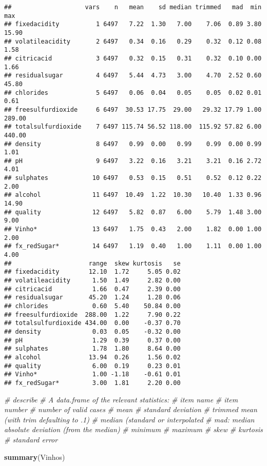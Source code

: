 \documentclass[]{article}
\newenvironment{Shaded}{\begin{snugshade}}{\end{snugshade}}
\newcommand{\KeywordTok}[1]{\textcolor[rgb]{0.13,0.29,0.53}{\textbf{#1}}}
\newcommand{\CommentTok}[1]{\textcolor[rgb]{0.56,0.35,0.01}{\textit{#1}}}
\newcommand{\NormalTok}[1]{#1}
\begin{document}
\begin{verbatim}
##                    vars    n   mean    sd median trimmed   mad  min    max
## fixedacidity          1 6497   7.22  1.30   7.00    7.06  0.89 3.80  15.90
## volatileacidity       2 6497   0.34  0.16   0.29    0.32  0.12 0.08   1.58
## citricacid            3 6497   0.32  0.15   0.31    0.32  0.10 0.00   1.66
## residualsugar         4 6497   5.44  4.73   3.00    4.70  2.52 0.60  45.80
## chlorides             5 6497   0.06  0.04   0.05    0.05  0.02 0.01   0.61
## freesulfurdioxide     6 6497  30.53 17.75  29.00   29.32 17.79 1.00 289.00
## totalsulfurdioxide    7 6497 115.74 56.52 118.00  115.92 57.82 6.00 440.00
## density               8 6497   0.99  0.00   0.99    0.99  0.00 0.99   1.01
## pH                    9 6497   3.22  0.16   3.21    3.21  0.16 2.72   4.01
## sulphates            10 6497   0.53  0.15   0.51    0.52  0.12 0.22   2.00
## alcohol              11 6497  10.49  1.22  10.30   10.40  1.33 0.96  14.90
## quality              12 6497   5.82  0.87   6.00    5.79  1.48 3.00   9.00
## Vinho*               13 6497   1.75  0.43   2.00    1.82  0.00 1.00   2.00
## fx_redSugar*         14 6497   1.19  0.40   1.00    1.11  0.00 1.00   4.00
##                     range  skew kurtosis   se
## fixedacidity        12.10  1.72     5.05 0.02
## volatileacidity      1.50  1.49     2.82 0.00
## citricacid           1.66  0.47     2.39 0.00
## residualsugar       45.20  1.24     1.28 0.06
## chlorides            0.60  5.40    50.84 0.00
## freesulfurdioxide  288.00  1.22     7.90 0.22
## totalsulfurdioxide 434.00  0.00    -0.37 0.70
## density              0.03  0.05    -0.32 0.00
## pH                   1.29  0.39     0.37 0.00
## sulphates            1.78  1.80     8.64 0.00
## alcohol             13.94  0.26     1.56 0.02
## quality              6.00  0.19     0.23 0.01
## Vinho*               1.00 -1.18    -0.61 0.01
## fx_redSugar*         3.00  1.81     2.20 0.00
\end{verbatim}

\begin{Shaded}
\begin{Highlighting}[]
\CommentTok{# describe}
\CommentTok{# A data.frame of the relevant statistics:}
\CommentTok{# item name}
\CommentTok{# item number}
\CommentTok{# number of valid cases}
\CommentTok{# mean}
\CommentTok{# standard deviation}
\CommentTok{# trimmed mean (with trim defaulting to .1)}
\CommentTok{# median (standard or interpolated}
\CommentTok{# mad: median absolute deviation (from the median)}
\CommentTok{# minimum}
\CommentTok{# maximum}
\CommentTok{# skew}
\CommentTok{# kurtosis}
\CommentTok{# standard error}


\KeywordTok{summary}\NormalTok{(Vinhos)}
\end{Highlighting}
\end{Shaded}
\end{document}

